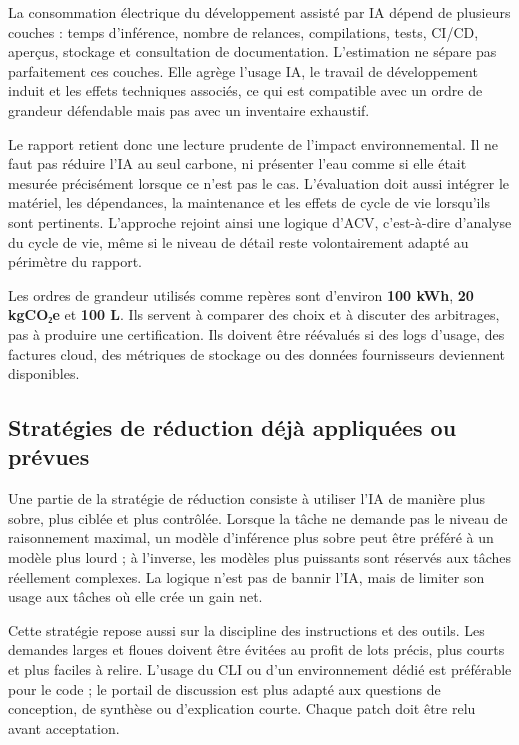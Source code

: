 \documentclass[
  10pt,
  a4paper,
  DIV=11,
  numbers=noendperiod,
  oneside]{scrreprt}
\let\oldtextbf\textbf
\renewcommand{\textbf}[1]{\oldtextbf{\textcolor{cmmnavy}{#1}}}
\begin{document}
La consommation électrique du développement assisté par IA dépend de
plusieurs couches : temps d'inférence, nombre de relances, compilations,
tests, CI/CD, aperçus, stockage et consultation de documentation.
L'estimation ne sépare pas parfaitement ces couches. Elle agrège l'usage
IA, le travail de développement induit et les effets techniques
associés, ce qui est compatible avec un ordre de grandeur défendable
mais pas avec un inventaire exhaustif.

Le rapport retient donc une lecture prudente de l'impact
environnemental. Il ne faut pas réduire l'IA au seul carbone, ni
présenter l'eau comme si elle était mesurée précisément lorsque ce n'est
pas le cas. L'évaluation doit aussi intégrer le matériel, les
dépendances, la maintenance et les effets de cycle de vie lorsqu'ils
sont pertinents. L'approche rejoint ainsi une logique d'ACV,
c'est-à-dire d'analyse du cycle de vie, même si le niveau de détail
reste volontairement adapté au périmètre du rapport.

Les ordres de grandeur utilisés comme repères sont d'environ \textbf{100
kWh}, \textbf{20 kgCO₂e} et \textbf{100 L}. Ils servent à comparer des
choix et à discuter des arbitrages, pas à produire une certification.
Ils doivent être réévalués si des logs d'usage, des factures cloud, des
métriques de stockage ou des données fournisseurs deviennent
disponibles.

\subsection{Stratégies de réduction déjà appliquées ou
prévues}\label{stratuxe9gies-de-ruxe9duction-duxe9juxe0-appliquuxe9es-ou-pruxe9vues}

Une partie de la stratégie de réduction consiste à utiliser l'IA de
manière plus sobre, plus ciblée et plus contrôlée. Lorsque la tâche ne
demande pas le niveau de raisonnement maximal, un modèle d'inférence
plus sobre peut être préféré à un modèle plus lourd ; à l'inverse, les
modèles plus puissants sont réservés aux tâches réellement complexes. La
logique n'est pas de bannir l'IA, mais de limiter son usage aux tâches
où elle crée un gain net.

Cette stratégie repose aussi sur la discipline des instructions et des
outils. Les demandes larges et floues doivent être évitées au profit de
lots précis, plus courts et plus faciles à relire. L'usage du CLI ou
d'un environnement dédié est préférable pour le code ; le portail de
discussion est plus adapté aux questions de conception, de synthèse ou
d'explication courte. Chaque patch doit être relu avant acceptation.
\end{document}
